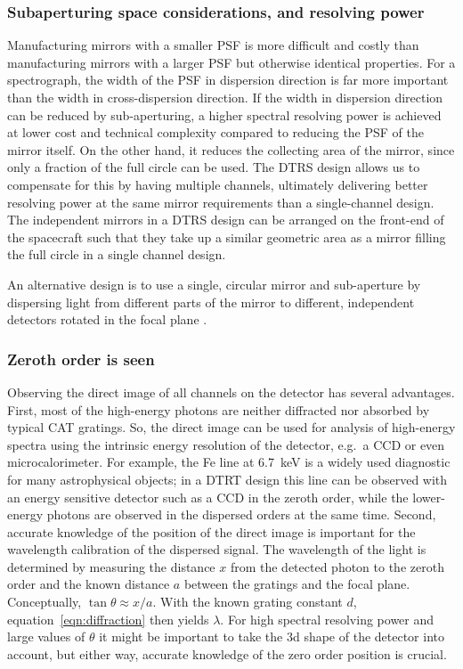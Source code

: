 \documentclass[twocolumn]{aastex631}
\begin{document}
\subsubsection{Subaperturing space considerations, and resolving power}
Manufacturing mirrors with a smaller PSF is more difficult and costly than manufacturing mirrors with a larger PSF but otherwise identical properties. For a spectrograph, the width of the PSF in dispersion direction is far more important than the width in cross-dispersion direction. If the width in dispersion direction can be reduced by sub-aperturing, a higher spectral resolving power is achieved at lower cost and technical complexity compared to reducing the PSF of the mirror itself. On the other hand, it reduces the collecting area of the mirror, since only a fraction of the full circle can be used. The DTRS design allows us to compensate for this by having multiple channels, ultimately delivering better resolving power at the same mirror requirements than a single-channel design. The independent mirrors in a DTRS design can be arranged on the front-end of the spacecraft such that they take up a similar geometric area as a mirror filling the full circle in a single channel design.

An alternative design is to use a single, circular mirror and sub-aperture by dispersing light from different parts of the mirror to different, independent detectors rotated in the focal plane \citep{2019JATIS...5b1003G}.

\subsubsection{Zeroth order is seen}
Observing the direct image of all channels on the detector has several advantages. First, most of the high-energy photons are neither diffracted nor absorbed by typical CAT gratings. So, the direct image can be used for analysis of high-energy spectra using the intrinsic energy resolution of the detector, e.g.\ a CCD or even microcalorimeter. For example, the Fe line at 6.7~keV is a widely used diagnostic for many astrophysical objects; in a DTRT design this line can be observed with an energy sensitive detector such as a CCD in the zeroth order, while the lower-energy photons are observed in the dispersed orders at the same time. Second, accurate knowledge of the position of the direct image is important for the wavelength calibration of the dispersed signal. The wavelength of the light is determined by measuring the distance $x$ from the detected photon to the zeroth order and the known distance $a$ between the gratings and the focal plane. Conceptually, $\tan \theta \approx x/a$. With the known grating constant $d$, equation~\ref{eqn:diffraction} then yields $\lambda$. For high spectral resolving power and large values of $\theta$ it might be important to take the 3d shape of the detector into account, but either way, accurate knowledge of the zero order position is crucial.
\end{document}
